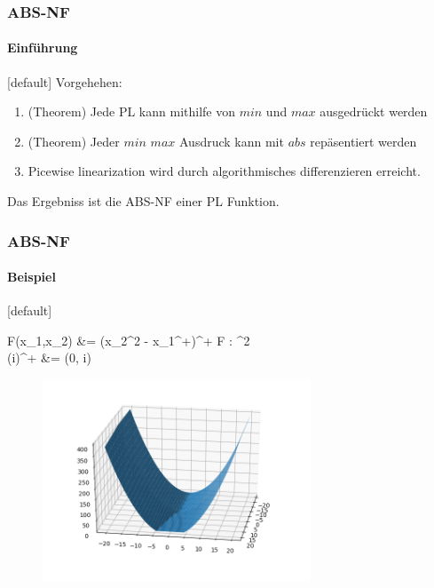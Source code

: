\begin{frame}
	\frametitle{ABS-NF}
	\framesubtitle{Einführung}
	[default]
	Vorgehehen:
	\begin{enumerate}
		\item<1-> (Theorem) Jede PL kann mithilfe von $min$ und $max$ ausgedrückt werden
		\item<2-> (Theorem) Jeder $min$ $max$ Ausdruck kann mit $abs$ repäsentiert werden
		\item<3-> Picewise linearization wird durch algorithmisches differenzieren erreicht.
	\end{enumerate}
	\pause
	
	\begin{center}
		Das Ergebniss ist die ABS-NF einer PL Funktion.
	\end{center}
\end{frame}
\begin{frame}
	\frametitle{ABS-NF}
	\framesubtitle{Beispiel}
	[default]
	\begin{flalign*}
		F(x_1,x_2) &= (x_2^2 - x_1^+)^+ \qquad F : ^2 \rightarrow {} \\
			 (i)^+ &= \max(0, i)
	\end{flalign*}
	\begin{figure}[h]
		\includegraphics[width=8cm]{img/minmax}
	\end{figure}
	
\end{frame}
